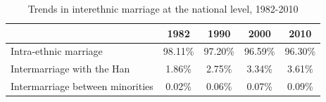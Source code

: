\begin{table}[htbp]
    \begin{center}
        \caption{Trends in interethnic marriage at the national level, 1982-2010}
        \label{tab:trends}
        \begin{tabular}{lcccc}
            \hline\hline
                                             & 1982    & 1990    & 2000    & 2010    \\
            \hline
            Intra-ethnic marriage            & 98.11\% & 97.20\% & 96.59\% & 96.30\% \\
            Intermarriage with the Han       & 1.86\%  & 2.75\%  & 3.34\%  & 3.61\%  \\
            Intermarriage between minorities & 0.02\%  & 0.06\%  & 0.07\%  & 0.09\%  \\
            \hline
        \end{tabular}
    \end{center}
\end{table}